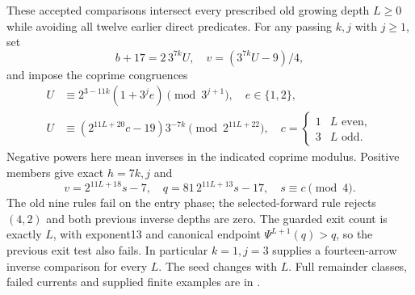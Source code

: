 \documentclass[11pt]{article}
\begin{document}
These accepted comparisons intersect every prescribed old growing
depth $L\ge0$ while avoiding all twelve earlier direct predicates.
For any passing $k,j$ with $j\ge1$, set
\[
 b+17=2\,3^{7k}U,\quad v=(3^{7k}U-9)/4,
\]
and impose the coprime congruences
\[
\begin{aligned}
 U&\equiv2^{3-11k}(1+3^j e)\pmod{3^{j+1}},\quad e\in\{1,2\},\\
 U&\equiv(2^{11L+20}c-19)3^{-7k}\pmod{2^{11L+22}},\quad
 c=\begin{cases}1&L\text{ even},\\3&L\text{ odd}.\end{cases}
\end{aligned}
\]
Negative powers here mean inverses in the indicated coprime modulus.
Positive members give exact $h=7k,j$ and
\[
 v=2^{11L+18}s-7,\quad q=81\,2^{11L+13}s-17,
 \quad s\equiv c\pmod4.
\]
The old nine rules fail on the entry phase; the selected-forward rule
rejects $(4,2)$ and both previous inverse depths are zero. The guarded
exit count is exactly $L$, with exponent13 and canonical endpoint
$\Psi^{L+1}(q)>q$, so the previous exit test also fails. In particular
$k=1,j=3$ supplies a fourteen-arrow inverse comparison for every $L$.
The seed changes with $L$. Full remainder classes, failed currents and
supplied finite examples are in
.
\end{document}
